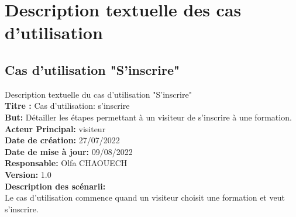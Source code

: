 \section{Description textuelle des cas d'utilisation}
\subsection{Cas d'utilisation "S'inscrire"}
Description textuelle du cas d'utilisation "S'inscrire"\\
\textbf{Titre :} Cas d'utilisation: s'inscrire\\
\textbf{But:} Détailler les étapes permettant à un visiteur de s'inscrire à une formation.\\
\textbf{Acteur Principal:} visiteur\\
\textbf{Date de création:} 27/07/2022\\
\textbf{Date de mise à jour:} 09/08/2022\\
\textbf{Responsable:} Olfa CHAOUECH\\
\textbf{Version:} 1.0\\
\textbf{Description des scénarii:}\\
Le cas d'utilisation commence quand un visiteur choisit une formation et veut s'inscrire.

